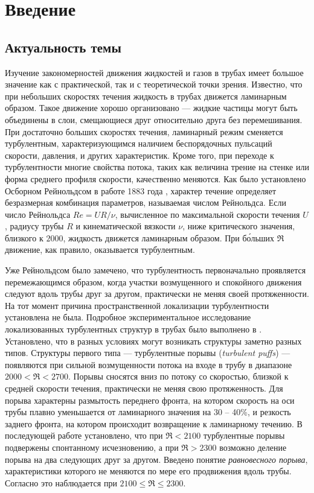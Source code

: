 \renewcommand \thechapter {i}
\thispagestyle{empty}
\phantom{.}
\chapter*{Введение}

\section{Актуальность темы} 

Изучение закономерностей движения жидкостей и газов в трубах имеет большое значение как с практической, так и с теоретической точки зрения. Известно, что при небольших скоростях течения жидкость в трубах движется ламинарным образом. Такое движение хорошо организовано --- жидкие частицы могут быть объединены в слои, смещающиеся друг относительно друга без перемешивания. При достаточно больших скоростях течения, ламинарный режим сменяется турбулентным, характеризующимся наличием беспорядочных пульсаций скорости, давления, и других характеристик. Кроме того, при переходе к турбулентности многие свойства потока, таких как величина трение на стенке или форма среднего профиля скорости, качественно меняются. Как было установлено Осборном Рейнольдсом в работе 1883 года \cite{Reynolds1883}, характер течение определяет безразмерная комбинация параметров, называемая числом Рейнольдса. Если число Рейнольдса $Re=UR/\nu$, вычисленное по максимальной скорости течения $U$, радиусу трубы $R$ и кинематической вязкости $\nu$, ниже критического значения, близкого к $2000$, жидкость движется ламинарным образом. При б\'{о}льших $\Re$ движение, как правило, оказывается турбулентным.

Уже Рейнольдсом было замечено, что турбулентность первоначально проявляется перемежающимся образом, когда участки возмущенного и спокойного движения следуют вдоль трубы друг за другом, практически не меняя своей протяженности. На тот момент причина пространственной локализации турбулентности установлена не была. Подробное экспериментальное исследование локализованных турбулентных структур в трубах было выполнено в \cite{Wygnanski1973}. Установлено, что в разных условиях могут возникать структуры заметно разных типов. Структуры первого типа --- турбулентные порывы ({\it turbulent puffs}) --- появляются при сильной возмущенности потока на входе в трубу в диапазоне $2000<\Re<2700$. Порывы сносятся вниз по потоку со скоростью, близкой к средней скорости течения, практически не меняя свою протяженность. Для порыва характерны размытость переднего фронта, на котором скорость на оси трубы плавно уменьшается от ламинарного значения на 30 -- 40\%, и резкость заднего фронта, на котором происходит возвращение к ламинарному течению. В последующей работе \cite{Wygnanski1975} установлено, что при $\Re<2100$ турбулентные порывы подвержены спонтанному исчезновению, а при $\Re>2300$ возможно деление порыва на два следующих друг за другом. Введено понятие {\it равновесного порыва}, характеристики которого не меняются по мере его продвижения вдоль трубы. Согласно \cite{Wygnanski1975} это наблюдается при $2100\leqslant\Re\leqslant2300$. 

